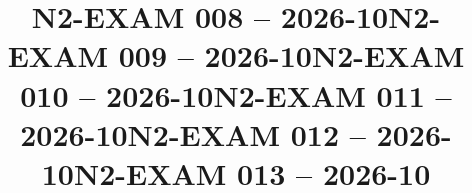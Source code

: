 \documentclass{ip-exam}
\begin{document}







\cleartoeven
\setcounter{questioncounter}{0}
\setcounter{page}{1}
\title{N2-EXAM 008 -- 2026-10}
\makeexamheader








\cleartoeven
\setcounter{questioncounter}{0}
\setcounter{page}{1}
\title{N2-EXAM 009 -- 2026-10}
\makeexamheader








\cleartoeven
\setcounter{questioncounter}{0}
\setcounter{page}{1}
\title{N2-EXAM 010 -- 2026-10}
\makeexamheader








\cleartoeven
\setcounter{questioncounter}{0}
\setcounter{page}{1}
\title{N2-EXAM 011 -- 2026-10}
\makeexamheader








\cleartoeven
\setcounter{questioncounter}{0}
\setcounter{page}{1}
\title{N2-EXAM 012 -- 2026-10}
\makeexamheader








\cleartoeven
\setcounter{questioncounter}{0}
\setcounter{page}{1}
\title{N2-EXAM 013 -- 2026-10}
\makeexamheader
\end{document}
